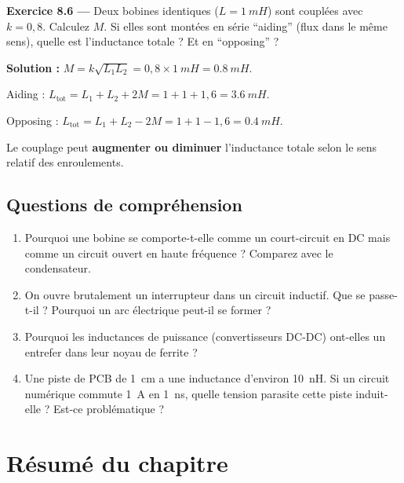\documentclass[12pt,a4paper,twoside]{book}
\begin{document}
\textbf{Exercice 8.6 ---} Deux bobines identiques ($L = \SI{1}{mH}$) sont couplées avec $k = 0{,}8$. Calculez $M$. Si elles sont montées en série ``aiding'' (flux dans le même sens), quelle est l'inductance totale ? Et en ``opposing'' ?

\begin{pratique}
\textbf{Solution :} $M = k\sqrt{L_1 L_2} = 0{,}8 \times \SI{1}{mH} = \SI{0.8}{mH}$.

Aiding : $L_{\text{tot}} = L_1 + L_2 + 2M = 1 + 1 + 1{,}6 = \SI{3.6}{mH}$.

Opposing : $L_{\text{tot}} = L_1 + L_2 - 2M = 1 + 1 - 1{,}6 = \SI{0.4}{mH}$.

Le couplage peut \textbf{augmenter ou diminuer} l'inductance totale selon le sens relatif des enroulements.
\end{pratique}

\subsection*{Questions de compréhension}

\begin{enumerate}[nosep]
\item Pourquoi une bobine se comporte-t-elle comme un court-circuit en DC mais comme un circuit ouvert en haute fréquence ? Comparez avec le condensateur.
\item On ouvre brutalement un interrupteur dans un circuit inductif. Que se passe-t-il ? Pourquoi un arc électrique peut-il se former ?
\item Pourquoi les inductances de puissance (convertisseurs DC-DC) ont-elles un entrefer dans leur noyau de ferrite ?
\item Une piste de PCB de \SI{1}{cm} a une inductance d'environ \SI{10}{nH}. Si un circuit numérique commute \SI{1}{A} en \SI{1}{ns}, quelle tension parasite cette piste induit-elle ? Est-ce problématique ?
\end{enumerate}

\section*{Résumé du chapitre}
\end{document}
